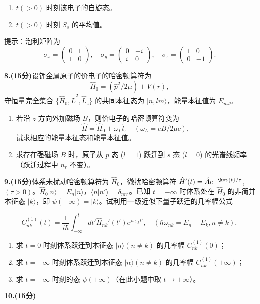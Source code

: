 \begin{enumerate}
    \item $t(>0)$ 时刻该电子的自旋态。
    \item $t(>0)$ 时刻 $S_s$ 的平均值。
\end{enumerate}

提示：泡利矩阵为
\[
\sigma_x = \begin{pmatrix}
0 & 1 \\
1 & 0
\end{pmatrix}, \quad
\sigma_y = \begin{pmatrix}
0 & -i \\
i & 0
\end{pmatrix}, \quad
\sigma_z = \begin{pmatrix}
1 & 0 \\
0 & -1
\end{pmatrix}.~
\]

\textbf{8.(15分)}设锂金属原子的价电子的哈密顿算符为 
\[
\hat{H}_0 = (\hat{p}^2/2\mu) + V(r),~
\]
守恒量完全集合 $\{\hat{H}_0, \hat{L}^2, \hat{L}_z\}$ 的共同本征态为 $\lvert n,l m \rangle$，能量本征值为 $E_{n_rl}$。

\begin{enumerate}
    \item 若沿 $z$ 方向外加磁场 $B$，则价电子的哈密顿算符变为 
    \[
    \hat{H} = \hat{H}_0 + \omega_L \hat{l}_z \quad (\omega_L = eB/2\mu c),~
    \]
    试求相应的能量本征态和能量本征值。
    
    \item 求存在强磁场 $B$ 时，原子从 $p$ 态 ($l = 1$) 跃迁到 $s$ 态 ($l = 0$) 的光谱线频率（跃迁过程中 $n_r$ 不变）。
\end{enumerate}

\textbf{9.(15分)}体系未扰动哈密顿算符为 $\hat{H}_0$，微扰哈密顿算符 $\hat{H}'(t) = \hat{A} e^{-\ket{t}/\tau}$, $(\tau > 0)$。$\hat{H}_0\lvert n \rangle = E_n \lvert n \rangle$，$\langle n \lvert n' \rangle = \delta_{nn'}$。已知 $t = -\infty$ 时体系处在 $\hat{H}_0$ 的非简并本征态 $\lvert k \rangle$，即 $\psi(-\infty) = \lvert k \rangle$。试利用一级近似下量子跃迁的几率幅公式

\[
C_{nk}^{(1)}(t) = \frac{1}{i\hbar} \int_{-\infty}^{t} dt' \hat{H}_{nk}'(t') e^{i\omega_{nk}t'}, \quad (\hbar \omega_{nk} = E_n - E_k, n \neq k),~
\]

\begin{enumerate}
    \item 求 $t = 0$ 时刻体系跃迁到本征态 $\lvert n \rangle (n \neq k)$ 的几率幅 $C_{nk}^{(1)}(0)$；
    \item 求 $t = +\infty$ 时刻体系跃迁到本征态 $\lvert n \rangle (n \neq k)$ 的几率幅 $C_{nk}^{(1)}(+\infty)$；
    \item 求 $t = +\infty$ 时刻的态 $\psi(+\infty)$（在此小题中取 $t \to +\infty$）。
\end{enumerate}


\textbf{10.(15分)}